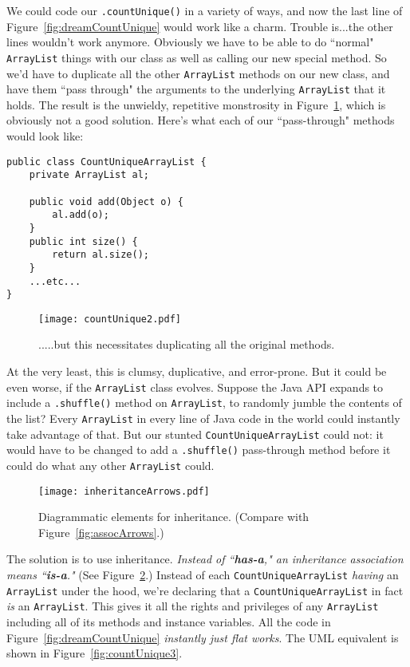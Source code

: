 We could code our \texttt{.countUnique()} in a variety of ways, and now the
last line of Figure~\ref{fig:dreamCountUnique} would work like a charm.
Trouble is...the other lines wouldn't work anymore. Obviously we have to be
able to do ``normal" \texttt{ArrayList} things with our class as well as
calling our new special method. So we'd have to duplicate all the other
\texttt{ArrayList} methods on our new class, and have them ``pass through" the
arguments to the underlying \texttt{ArrayList} that it holds. The result is
the unwieldy, repetitive monstrosity in Figure~\ref{fig:countUnique2}, which
is obviously not a good solution. Here's what each of our ``pass-through"
methods would look like:

\begin{Verbatim}[fontsize=\small,samepage=true,frame=single]
public class CountUniqueArrayList {
    private ArrayList al;

    public void add(Object o) {
        al.add(o);
    }
    public int size() {
        return al.size();
    }
    ...etc...
}\end{Verbatim}


\begin{figure}
\centering
\texttt{[image: countUnique2.pdf]}  %
\caption{.....but this necessitates duplicating all the original methods.}
\label{fig:countUnique2}
\end{figure}

At the very least, this is clumsy, duplicative, and error-prone. But it could
be even worse, if the \texttt{ArrayList} class evolves. Suppose the Java API
expands to include a \texttt{.shuffle()} method on \texttt{ArrayList}, to
randomly jumble the contents of the list? Every \texttt{ArrayList} in every
line of Java code in the world could instantly take advantage of that. But our
stunted \texttt{CountUniqueArrayList} could not: it would have to be changed
to add a \texttt{.shuffle()} pass-through method before it could do what any
other \texttt{ArrayList} could.

\begin{figure}
\centering
\texttt{[image: inheritanceArrows.pdf]}
\caption{Diagrammatic elements for inheritance. (Compare with
Figure~\ref{fig:assocArrows}.)}
\label{fig:inheritanceArrows}
\end{figure}

The solution is to use inheritance. \textit{Instead of ``\textbf{has-a}," an
inheritance association means ``\textbf{is-a}."} (See
Figure~\ref{fig:inheritanceArrows}.) Instead of each
\texttt{CountUniqueArrayList} \textit{having} an \texttt{ArrayList} under the
hood, we're declaring that a \texttt{CountUniqueArrayList} in fact \textit{is}
an \texttt{ArrayList}. This gives it all the rights and privileges of any
\texttt{ArrayList} including all of its methods and instance variables. All
the code in Figure~\ref{fig:dreamCountUnique} \textit{instantly just flat
works}. The UML equivalent is shown in Figure~\ref{fig:countUnique3}.

